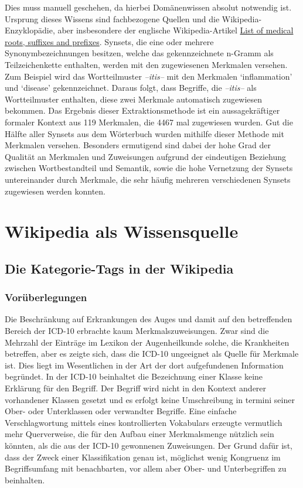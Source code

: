 \documentclass[pagesize,DIV=calc,12pt,draft]{scrreprt}
\begin{document}
Dies muss manuell geschehen, da hierbei Domänenwissen absolut notwendig ist. 
Ursprung dieses Wissens sind fachbezogene Quellen und die Wikipedia-Enzyklopädie, aber insbesondere der englische Wikipedia-Artikel \href{http://en.wikipedia.org/wiki/List_of_medical_roots,_suffixes_and_prefixes}{List of medical roots, suffixes and prefixes}. 
Synsets, die eine oder mehrere Synonymbezeichnungen besitzen, welche das gekennzeichnete n-Gramm als Teilzeichenkette enthalten, werden mit den zugewiesenen Merkmalen versehen. 
Zum Beispiel wird das Wortteilmuster \emph{--itis--} mit den Merkmalen `inflammation' und `disease' gekennzeichnet. 
Daraus folgt, dass Begriffe, die \emph{--itis--} als Wortteilmuster enthalten, diese zwei Merkmale automatisch zugewiesen bekommen. 
Das Ergebnis dieser Extraktionsmethode ist ein aussagekräftiger formaler Kontext aus 119 Merkmalen, die 4467 mal zugewiesen wurden. 
Gut die Hälfte aller Synsets aus dem Wörterbuch wurden mithilfe dieser Methode mit Merkmalen versehen. 
Besonders ermutigend sind dabei der hohe Grad der Qualität an Merkmalen und Zuweisungen aufgrund der eindeutigen Beziehung zwischen Wortbestandteil und Semantik, sowie die hohe Vernetzung der Synsets untereinander durch Merkmale, die sehr häufig mehreren verschiedenen Synsets zugewiesen werden konnten. 

\section{Wikipedia als Wissensquelle}

\subsection{Die Kategorie-Tags in der Wikipedia}

\subsubsection{Vorüberlegungen}
Die Beschränkung auf Erkrankungen des Auges und damit auf den betreffenden Bereich der ICD-10 erbrachte kaum Merkmalszuweisungen.
Zwar sind die Mehrzahl der Einträge im Lexikon der Augenheilkunde solche, die Krankheiten betreffen, aber es zeigte sich, dass die ICD-10 ungeeignet als Quelle für Merkmale ist.
Dies liegt im Wesentlichen in der Art der dort aufgefundenen Information begründet.
In der ICD-10 beinhaltet die Bezeichnung einer Klasse keine Erklärung für den Begriff. 
Der Begriff wird nicht in den Kontext anderer vorhandener Klassen gesetzt und es erfolgt keine Umschreibung in termini seiner Ober- oder Unterklassen oder verwandter Begriffe. 
Eine einfache Verschlagwortung mittels eines kontrollierten Vokabulars erzeugte vermutlich mehr Querverweise, die für den Aufbau einer Merkmalsmenge nützlich sein könnten, als die aus der ICD-10 gewonnenen Zuweisungen. 
Der Grund dafür ist, dass der Zweck einer Klassifikation genau ist, möglichst wenig Kongruenz im Begriffsumfang mit benachbarten, vor allem aber Ober- und Unterbegriffen zu beinhalten. 
\end{document}
